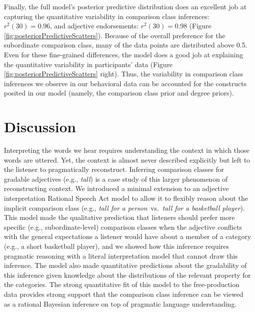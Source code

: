 \documentclass[doc]{apa6}
\begin{document}
Finally, the full model's posterior predictive distribution does an excellent job at capturing the quantitative variability in comparison class inferences: \(r^2(30) = 0.96\), and adjective endorsements: \(r^2(30) = 0.98\) (Figure \ref{fig:posteriorPredictiveScatters}). Because of the overall preference for the subordinate comparison class, many of the data points are distributed above 0.5. Even for these fine-grained differences, the model does a good job at explaining the quantitative variability in participants' data (Figure \ref{fig:posteriorPredictiveScatters} right). Thus, the variability in comparison class inferences we observe in our behavioral data can be accounted for the constructs posited in our model (namely, the comparison class prior and degree priors).

\section{Discussion}

Interpreting the words we hear requires understanding the context in which those words are uttered.
Yet, the context is almost never described explicitly but left to the listener to pragmatically reconstruct. 
Inferring comparison classes for gradable adjectives (e.g., \emph{tall}) is a case study of this larger phenomenon of reconstructing context. 
We introduced a minimal extension to an adjective interpretation Rational Speech Act model to allow it to flexibly reason about the implicit comparison class (e.g., \emph{tall for a person}~vs.~\emph{tall for a basketball player}).
This model made the qualitative prediction that listeners should prefer more specific (e.g., subordinate-level) comparison classes when the adjective conflicts with the general expectations a listener would have about a member of a category (e.g., a short basketball player), and we showed how this inference requires pragmatic reasoning with a literal interpretation model that cannot draw this inference. 
The model also made quantitative predictions about the gradability of this inference given knowledge about the distributions of the relevant property for the categories. 
The strong quantitative fit of this model to the free-production data provides strong support that the comparison class inference can be viewed as a rational Bayesian inference on top of pragmatic language understanding. 
\end{document}
